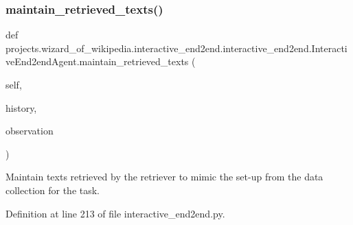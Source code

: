 \subsubsection{\texorpdfstring{maintain\+\_\+retrieved\+\_\+texts()}{maintain\_retrieved\_texts()}}
{\footnotesize\ttfamily def projects.\+wizard\+\_\+of\+\_\+wikipedia.\+interactive\+\_\+end2end.\+interactive\+\_\+end2end.\+Interactive\+End2end\+Agent.\+maintain\+\_\+retrieved\+\_\+texts (\begin{DoxyParamCaption}\item[{}]{self,  }\item[{}]{history,  }\item[{}]{observation }\end{DoxyParamCaption})}

\begin{DoxyVerb}Maintain texts retrieved by the retriever to mimic the set-up from the data
collection for the task.
\end{DoxyVerb}
 

Definition at line 213 of file interactive\+\_\+end2end.\+py.


